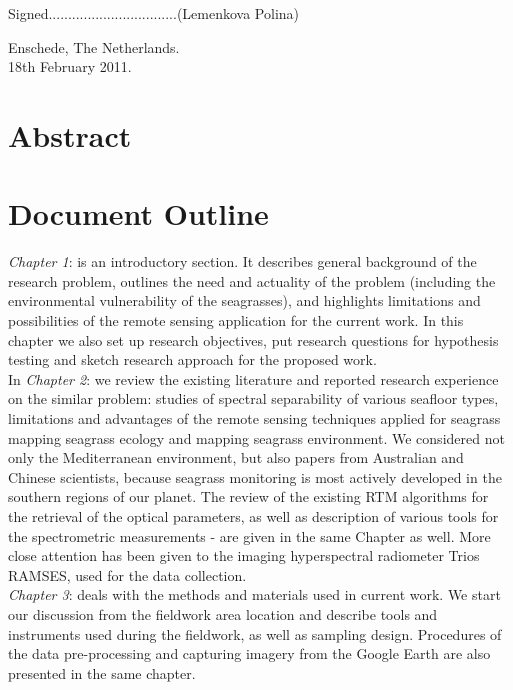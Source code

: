 \documentclass[10pt, a4paper]{article}
\begin{document}
\vspace{1em}

		Signed.................................(Lemenkova Polina) \\

\vspace{1em}

		Enschede, The Netherlands. \\ 18th February 2011.
\pagebreak

\section*{Abstract}
\pagebreak

\section*{Document Outline}
\textit{Chapter 1}:  is an introductory section. It describes general background of the research problem, outlines the need and actuality of the problem (including the environmental vulnerability of the seagrasses), and highlights limitations and possibilities of the remote sensing application for the current work. In this chapter we also set up research objectives, put research questions for hypothesis testing and sketch research approach for the proposed work.\\
In \textit{Chapter 2}:  we review the existing literature and reported research experience on the similar problem: studies of spectral separability of various seafloor types, limitations and advantages of the remote sensing techniques applied for seagrass mapping seagrass ecology and mapping seagrass environment. We considered not only the Mediterranean environment, but also papers from Australian and Chinese scientists, because seagrass monitoring is most actively developed in the southern regions of our planet. The review of the existing RTM algorithms for the retrieval of the optical parameters, as well as description of various tools for the spectrometric measurements - are given in the same Chapter as well. More close attention has been given to the imaging hyperspectral radiometer Trios RAMSES, used for the data collection.\\
\textit{Chapter 3}:  deals with the methods and materials used in current work. We start our discussion from the fieldwork area location and describe tools and instruments used during the fieldwork, as well as sampling design. Procedures of the data pre-processing and capturing imagery from the Google Earth are also presented in the same chapter. \\
\end{document}
